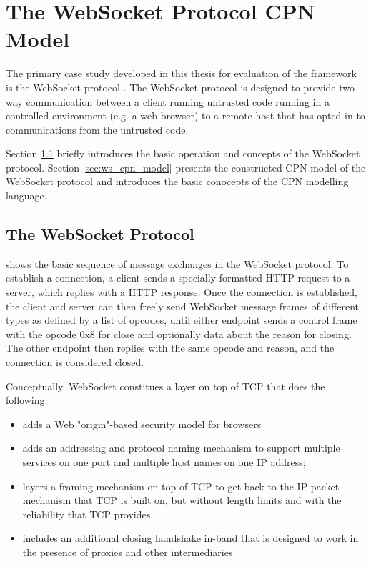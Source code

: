 \chapter{The WebSocket Protocol CPN Model}
\label{chap:background}

The primary case study developed in this thesis for evaluation of the \thename{}
framework is the WebSocket protocol \cite{draft-ietf-hybi-thewebsocketprotocol}.
The WebSocket protocol is designed to provide two-way communication between a
client running untrusted code running in a controlled environment (e.g. a web
browser) to a remote host that has opted-in to communications from the untrusted code.

Section \ref{sec:ws} briefly introduces the basic operation and concepts of the
WebSocket protocol. Section \ref{sec:ws_cpn_model} presents the constructed CPN
model of the WebSocket protocol and introduces the basic conocepts of the CPN
modelling language.

\section{The WebSocket Protocol}\label{sec:ws}

 shows the basic sequence of message exchanges in the
WebSocket protocol.
To establish a connection, a client sends a specially formatted HTTP request to
a server, which replies with a HTTP response. Once the connection is
established, the client and server can then freely send WebSocket message frames
of different types as defined by a list of opcodes, until either endpoint sends
a control frame with the opcode 0x8 for close and optionally data about the
reason for closing. The other endpoint then replies with the same opcode and
reason, and the connection is considered closed.

Conceptually, WebSocket constitues a layer on top of TCP that
does the following:
\begin{itemize}
	\item adds a Web "origin"-based security model for browsers

	\item adds an addressing and protocol naming mechanism to support
	multiple services on one port and multiple host names on one IP
	address;

	\item layers a framing mechanism on top of TCP to get back to the IP
	packet mechanism that TCP is built on, but without length limits and with
	the reliability that TCP provides

	\item includes an additional closing handshake in-band that is designed
	to work in the presence of proxies and other intermediaries
\end{itemize}

